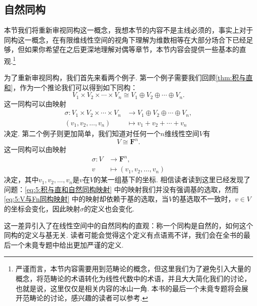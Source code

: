 \subsection{自然同构} \label{subsec:自然同构}

本节我们将重新审视同构这一概念，我想本节的内容不是主线必须的，事实上对于同构这一概念，在有限维线性空间的视角下理解为维数相等在大部分场合下已经足够，但如果你希望在之后更深地理解对偶等章节，本节内容会提供一些基本的直观.\footnote{严谨而言，本节内容需要用到范畴论的概念，但这里我们为了避免引入大量的概念，将范畴论的术语转化为线性代数中的术语，并且大大简化我们的讨论，也就是说，这里仅仅是相关内容的冰山一角. 本书的最后一个未竟专题将会展开范畴论的讨论，感兴趣的读者可以参考.}

为了重新审视同构，我们首先来看两个例子. 第一个例子需要我们回顾\autoref{thm:积与直和}，作为一个推论我们可以得到如下同构：
\begin{equation} \label{eq:5:积与直和自然同构}
    V_1\times V_2\times\cdots\times V_n\cong V_1\oplus V_2\oplus\cdots\oplus V_n.
\end{equation}
这一同构可以由映射
\begin{equation} \label{eq:5:积与直和自然同构映射}
    \begin{aligned}
        \sigma:V_1\times V_2\times\cdots\times V_n & \to V_1\oplus V_2\oplus\cdots\oplus V_n, \\
        (v_1,v_2,\ldots,v_n)                       & \mapsto v_1+v_2+\cdots+v_n
    \end{aligned}
\end{equation}
决定. 第二个例子则更加简单，我们知道对任何一个$n$维线性空间$V$有
\begin{equation} \label{eq:5:V与Fn同构}
    V\cong\mathbf{F}^n.
\end{equation}
这一同构可以由映射
\begin{equation} \label{eq:5:V与Fn同构映射}
    \begin{aligned}
        \sigma:V & \to\mathbf{F}^n,            \\
        v        & \mapsto(v_1,v_2,\ldots,v_n)
    \end{aligned}
\end{equation}
决定，其中$v_1,v_2,\ldots,v_n$是$v$在$V$的某一组基下的坐标. 相信读者读到这里已经发现了问题：\autoref{eq:5:积与直和自然同构映射} 中的映射我们并没有强调基的选取，然而\autoref{eq:5:V与Fn同构映射} 中的映射却依赖于基的选取，当$V$的基选取不一致时，$v\in V$的坐标会变化，因此映射$\sigma$的定义也会变化.

这一差异引入了在线性空间中的自然同构的直观：称一个同构是自然的，如何这个同构的定义与基无关. 读者可能会觉得这个定义有点语焉不详，我们会在全书的最后一个未竟专题中给出更加严谨的定义.

